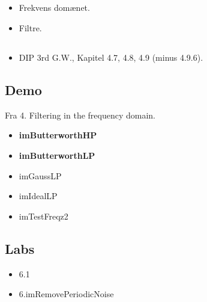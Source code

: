 \subsection{\subtopics}

\begin{itemize}
	\item Frekvens domænet.
	\item Filtre.
\end{itemize}

\subsection{\curriculum}

\begin{itemize}
	\item DIP 3rd G.W., Kapitel 4.7, 4.8, 4.9 (minus 4.9.6).
\end{itemize}

\subsection{Demo}

Fra 4. Filtering in the frequency domain.

\begin{itemize}
	\item \textbf{imButterworthHP}
	\item \textbf{imButterworthLP}
	\item imGaussLP
	\item imIdealLP
	\item imTestFreqz2
\end{itemize}

\subsection{Labs}

\begin{itemize}
	\item 6.1
	\item 6.imRemovePeriodicNoise
\end{itemize}

